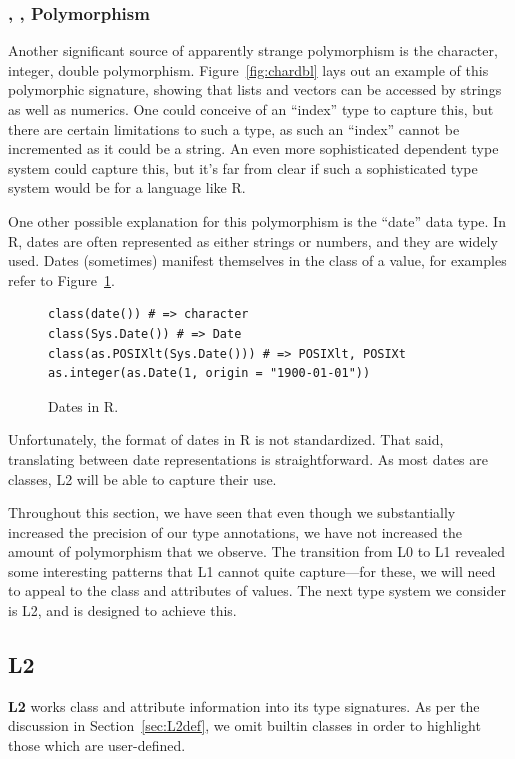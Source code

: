 \documentclass[acmsmall,10pt,review,anonymous]{acmart}\settopmatter{printfolios=true,printccs=false,printacmref=false}
\begin{document}
%
%
\subsubsection{\C, \I, \D Polymorphism}
Another significant source of apparently strange polymorphism is the character, integer, double polymorphism.
Figure~\ref{fig:chardbl} lays out an example of this polymorphic signature, showing that lists and vectors can be accessed by strings as well as numerics.
One could conceive of an ``index'' type to capture this, but there are certain limitations to such a type, as such an ``index'' cannot be incremented as it could be a string.
An even more sophisticated dependent type system could capture this, but it's far from clear if such a sophisticated type system would be for a language like R.

One other possible explanation for this polymorphism is the ``date'' data type.
In R, dates are often represented as either strings or numbers, and they are widely used.
Dates (sometimes) manifest themselves in the class of a value, for examples refer to Figure~\ref{fig:date}.
\begin{figure}[!hb]{\small\begin{lstlisting}[style=R]
class(date()) # => character
class(Sys.Date()) # => Date
class(as.POSIXlt(Sys.Date())) # => POSIXlt, POSIXt
as.integer(as.Date(1, origin = "1900-01-01"))
\end{lstlisting}}\caption{Dates in R.}\label{fig:date}\end{figure}

Unfortunately, the format of dates in R is not standardized.
That said, translating between date representations is straightforward.
As most dates are classes, L2 will be able to capture their use.

Throughout this section, we have seen that even though we substantially increased the precision of our type annotations, we have not increased the amount of polymorphism that we observe.
The transition from L0 to L1 revealed some interesting patterns that L1 cannot quite capture---for these, we will need to appeal to the class and attributes of values.
The next type system we consider is L2, and is designed to achieve this.

%
%
%
%
\subsection{L2}

{\bf L2} works class and attribute information into its type signatures.
As per the discussion in Section~\ref{sec:L2def}, we omit builtin classes in order to highlight those which are user-defined.
\end{document}
